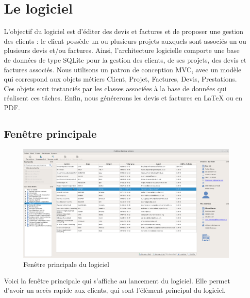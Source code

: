 \section{Le logiciel}
L’objectif du logiciel est d’éditer des devis et factures et de proposer une gestion des clients :
le client possède un ou plusieurs projets auxquels sont associés un ou plusieurs devis et/ou factures.
Ainsi, l’architecture logicielle comporte une base de données de type SQLite pour la gestion des
clients, de ses projets, des devis et factures associés. Nous utilisons un patron de conception MVC,
avec un modèle qui correspond aux objets métiers Client, Projet, Factures, Devis, Prestations. Ces
objets sont instanciés par les classes associées à la base de données qui réalisent ces tâches. Enfin,
nous générerons les devis et factures en LaTeX ou en PDF.

\subsection{Fenêtre principale}
\begin{figure}[H]
	\centering
	\includegraphics[width=17cm]{screens/ihmClients.png}
	\caption{Fenêtre principale du logiciel \FactDev}
	\label{fig:principal_window}
\end{figure}

Voici la fenêtre principale qui s'affiche au lancement du logiciel. Elle permet d'avoir un accès rapide aux clients, qui sont l'élément principal du logiciel.

